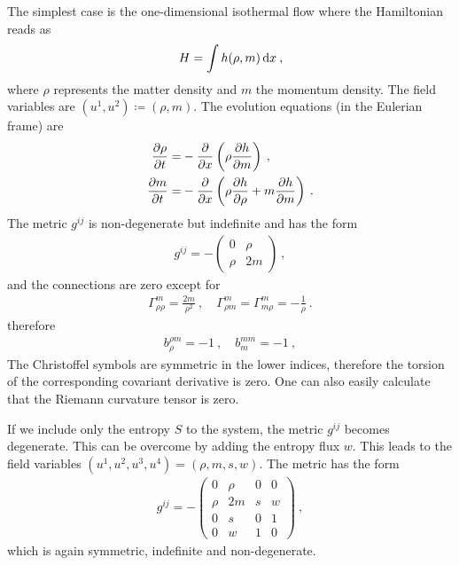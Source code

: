 \begin{example} \label{example:1D isothermal}
    The simplest case is the one-dimensional isothermal flow where the Hamiltonian reads as
    \begin{align}
        H = \int h(\rho, m) \, \mathrm{d} x \:,
    \end{align}
    where $\rho$ represents the matter density and $m$ the momentum density. 
    The field variables are $(u^1,u^2) \coloneqq (\rho,m)$.
    The evolution equations (in the Eulerian frame) are
    \begin{align}
        \frac{\partial \rho}{\partial t} =& - \frac{\partial }{\partial x} \left( \rho \frac{\partial h}{\partial m} \right) \:, \\
        \frac{\partial m}{\partial t} =& - \frac{\partial }{\partial x} \left( \rho \frac{\partial h}{\partial \rho} + m \frac{\partial h}{\partial m} \right) \:.
    \end{align}
    The metric $g^{ij}$ is non-degenerate but indefinite and has the form
    \begin{align}
        g^{ij} = -\begin{pmatrix}
            0 &  \rho \\
            \rho &  2 m
        \end{pmatrix} \:,
    \end{align}
    and the connections are zero except for
    \begin{align}
        \Gamma^{m}_{\rho \rho} = \frac{2m}{\rho^2} \:, \quad \Gamma^m_{\rho m} = \Gamma^m_{m \rho} = - \frac{1}{\rho} \:.
    \end{align}
    therefore
    \begin{align}
        b^{\rho m}_\rho = -1 \:, \quad b^{m m}_m = -1 \:,
    \end{align}
    The Christoffel symbols are symmetric in the lower indices, therefore the torsion of the corresponding covariant derivative is zero. One can also easily calculate that the Riemann curvature tensor is zero.
\end{example}

\begin{example}
    If we include only the entropy $S$ to the system, the metric $g^{ij}$ becomes degenerate. This can be overcome by adding the entropy flux $w$. This leads to the field variables $(u^1,u^2,u^3,u^4) = (\rho,m,s,w) $. The metric has the form
    \begin{align}
        g^{ij} = -\begin{pmatrix}
            0 & \rho & 0 & 0 \\
            \rho & 2m & s & w \\
            0 & s & 0 & 1 \\
            0 & w & 1 & 0
        \end{pmatrix} \:,
    \end{align}
    which is again symmetric, indefinite and non-degenerate.
\end{example}

